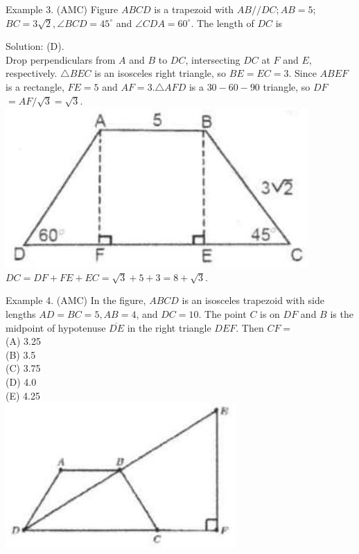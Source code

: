 \documentclass[10pt]{article}
\begin{document}
Example 3. (AMC) Figure \(A B C D\) is a trapezoid with \(A B / / D C ; A B=5\);\\
\(B C=3 \sqrt{2}, \angle B C D=45^{\circ}\) and \(\angle C D A=60^{\circ}\). The length of \(D C\) is

Solution: (D).\\
Drop perpendiculars from \(A\) and \(B\) to \(D C\), intersecting \(D C\) at \(F\) and \(E\), respectively. \(\triangle B E C\) is an isosceles right triangle, so \(B E=E C=3\). Since \(A B E F\) is a rectangle, \(F E=5\) and \(A F=3 . \triangle A F D\) is a \(30-60-90\) triangle, so \(D F\) \(=A F / \sqrt{3}=\sqrt{3}\).\\
\includegraphics[max width=\textwidth, center]{2025_04_17_97bc1f7e44d93c271a88g-076(2)}\\
\(D C=D F+F E+E C=\sqrt{3}+5+3=8+\sqrt{3}\).

Example 4. (AMC) In the figure, \(A B C D\) is an isosceles trapezoid with side lengths \(A D=B C=5, A B=4\), and \(D C=10\). The point \(C\) is on \(D F\) and \(B\) is the midpoint of hypotenuse \(\overline{D E}\) in the right triangle \(D E F\). Then \(C F=\)\\
(A) 3.25\\
(B) 3.5\\
(C) 3.75\\
(D) 4.0\\
(E) 4.25\\
\includegraphics[max width=\textwidth, center]{2025_04_17_97bc1f7e44d93c271a88g-076(1)}
\end{document}
